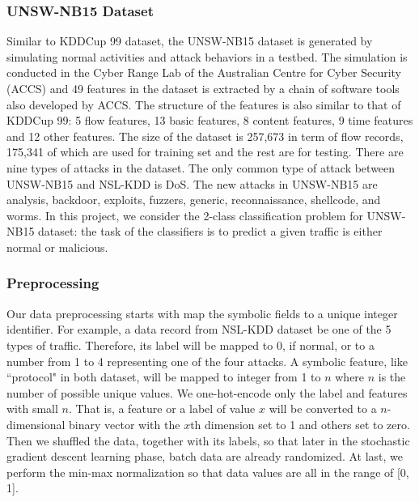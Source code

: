 \subsubsection{UNSW-NB15 Dataset}
Similar to KDDCup 99 dataset, the UNSW-NB15 dataset is generated by simulating normal
activities and attack behaviors in a testbed.
The simulation is conducted in the Cyber Range Lab of the Australian Centre for Cyber Security (ACCS)
and 49 features in the dataset is extracted by a chain of software tools also developed by ACCS.
The structure of the features is also similar to that of KDDCup 99: 5 flow features,
13 basic features, 8 content features, 9 time features and 12 other features.
The size of the dataset is 257,673 in term of flow records, 175,341 of which are used for
training set and the rest are for testing.
There are nine types of attacks in the dataset.
The only common type of attack between UNSW-NB15 and NSL-KDD is DoS.
The new attacks in UNSW-NB15 are analysis, backdoor, exploits, fuzzers, generic, reconnaissance, shellcode, and worms.
In this project, we consider the 2-class classification problem for UNSW-NB15 dataset: the
task of the classifiers is to predict a given traffic is either normal or malicious.

\subsubsection{Preprocessing}
Our data preprocessing starts with map the symbolic fields to a unique integer identifier.
For example, a data record from NSL-KDD dataset be one of the 5 types of traffic.
Therefore, its label will be mapped to 0, if normal, or to a number from 1 to 4 representing one of the four attacks.
A symbolic feature, like ``protocol" in both dataset, will be mapped to integer from 1 to $n$
where $n$ is the number of possible unique values.
We one-hot-encode only the label and features with small $n$.
That is, a feature or a label of value $x$ will be converted to a $n$-dimensional binary vector
with the $x$th dimension set to 1 and others set to zero.
Then we shuffled the data, together with its labels, so that later in the stochastic
gradient descent learning phase, batch data are already randomized.
At last, we perform the min-max normalization so that data values are all in the range
of [0, 1].



